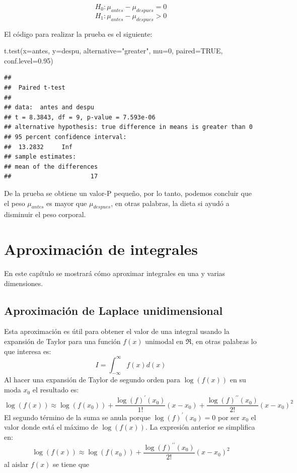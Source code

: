 \documentclass[
]{book}
\makeatletter
\newenvironment{Shaded}{\begin{snugshade}}{\end{snugshade}}
\newcommand{\AttributeTok}[1]{\textcolor[rgb]{0.77,0.63,0.00}{#1}}
\newcommand{\ConstantTok}[1]{\textcolor[rgb]{0.00,0.00,0.00}{#1}}
\newcommand{\DecValTok}[1]{\textcolor[rgb]{0.00,0.00,0.81}{#1}}
\newcommand{\FloatTok}[1]{\textcolor[rgb]{0.00,0.00,0.81}{#1}}
\newcommand{\FunctionTok}[1]{\textcolor[rgb]{0.00,0.00,0.00}{#1}}
\newcommand{\NormalTok}[1]{#1}
\newcommand{\StringTok}[1]{\textcolor[rgb]{0.31,0.60,0.02}{#1}}
\newenvironment{kframe}{%
\medskip{}
\setlength{\fboxsep}{.8em}
 \def\at@end@of@kframe{}%
 \ifinner\ifhmode%
  \def\at@end@of@kframe{\end{minipage}}%
  \begin{minipage}{\columnwidth}%
 \fi\fi%
 \def\FrameCommand##1{\hskip\@totalleftmargin \hskip-\fboxsep
 \colorbox{shadecolor}{##1}\hskip-\fboxsep
     \hskip-\linewidth \hskip-\@totalleftmargin \hskip\columnwidth}%
 \MakeFramed {\advance\hsize-\width
   \@totalleftmargin\z@ \linewidth\hsize
   \@setminipage}}%
 {\par\unskip\endMakeFramed%
 \at@end@of@kframe}
\renewenvironment{Shaded}{\begin{kframe}}{\end{kframe}}
\makeatother
\begin{document}
\[H_0: \mu_{antes}  - \mu_{despues} = 0\]
\[H_1: \mu_{antes}  - \mu_{despues} > 0\]

El código para realizar la prueba es el siguiente:

\begin{Shaded}
\begin{Highlighting}[]
\FunctionTok{t.test}\NormalTok{(}\AttributeTok{x=}\NormalTok{antes, }\AttributeTok{y=}\NormalTok{despu, }\AttributeTok{alternative=}\StringTok{"greater"}\NormalTok{, }\AttributeTok{mu=}\DecValTok{0}\NormalTok{, }
       \AttributeTok{paired=}\ConstantTok{TRUE}\NormalTok{, }\AttributeTok{conf.level=}\FloatTok{0.95}\NormalTok{)}
\end{Highlighting}
\end{Shaded}

\begin{verbatim}
## 
##  Paired t-test
## 
## data:  antes and despu
## t = 8.3843, df = 9, p-value = 7.593e-06
## alternative hypothesis: true difference in means is greater than 0
## 95 percent confidence interval:
##  13.2832     Inf
## sample estimates:
## mean of the differences 
##                      17
\end{verbatim}

De la prueba se obtiene un valor-P pequeño, por lo tanto, podemos concluir que el peso \(\mu_{antes}\) es mayor que \(\mu_{despues}\), en otras palabras, la dieta si ayudó a disminuir el peso corporal.

\hypertarget{aproxint}{%
\chapter{Aproximación de integrales}\label{aproxint}}

En este capítulo se mostrará cómo aproximar integrales en una y varias dimensiones.

\hypertarget{aproximaciuxf3n-de-laplace-unidimensional}{%
\section{Aproximación de Laplace unidimensional}\label{aproximaciuxf3n-de-laplace-unidimensional}}

Esta aproximación es útil para obtener el valor de una integral usando la expansión de Taylor para una función \(f(x)\) unimodal en \(\Re\), en otras palabras lo que interesa es:
\[ I = \int_{-\infty}^{\infty} f(x) d(x)\]
Al hacer una expansión de Taylor de segundo orden para \(\log(f(x))\) en su moda \(x_0\) el resultado es:
\[ \log(f(x)) \approx \log(f(x_0)) + \frac{\log(f)^\prime(x_0)}{1!} (x-x_0) + \frac{\log(f)^{\prime \prime}(x_0)}{2!} (x-x_0)^2 \]
El segundo término de la suma se anula porque \(\log(f)^\prime(x_0)=0\) por ser \(x_0\) el valor donde está el máximo de \(\log(f(x))\). La expresión anterior se simplifica en:
\[ \log(f(x)) \approx \log(f(x_0)) + \frac{\log(f)^{\prime \prime}(x_0)}{2!} (x-x_0)^2 \]
al aislar \(f(x)\) se tiene que
\end{document}
